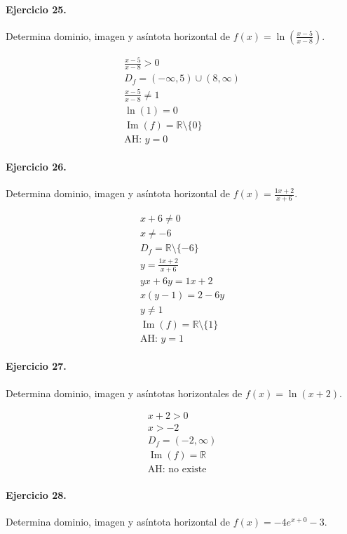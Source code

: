 \documentclass[11pt,a4paper]{article}
\begin{document}
\paragraph{Ejercicio 25.} Determina dominio, imagen y asíntota horizontal de $f(x)=\ln\left(\frac{x-5}{x-8}\right)$.

\[
\begin{aligned}
\frac{x-5}{x-8} >0\\
D_f=(-\infty,5)\cup(8,\infty)\\
\frac{x-5}{x-8}\ne1\\
\ln(1)=0\\
\operatorname{Im}(f)=\mathbb{R}\setminus\{0\}\\
\text{{AH: }}y=0
\end{aligned}
\]


\paragraph{Ejercicio 26.} Determina dominio, imagen y asíntota horizontal de $f(x)=\frac{1x+2}{x+6}$.

\[
\begin{aligned}
x+6\ne0\\
x\ne -6\\
D_f=\mathbb{R}\setminus\{-6\}\\
y=\frac{1x+2}{x+6}\\
yx+6y=1x+2\\
x(y-1)=2-6y\\
y\ne 1\\
\operatorname{Im}(f)=\mathbb{R}\setminus\{1\}\\
\text{AH: }y=1
\end{aligned}
\]


\paragraph{Ejercicio 27.} Determina dominio, imagen y asíntotas horizontales de $f(x)=\ln(x+2)$.

\[
\begin{aligned}
x+2>0\\
x>-2\\
D_f=(-2,\infty)\\
\operatorname{Im}(f)=\mathbb{R}\\
\text{{AH: no existe}}
\end{aligned}
\]


\paragraph{Ejercicio 28.} Determina dominio, imagen y asíntota horizontal de $f(x)=-4e^{x+0}-3$.
\end{document}
